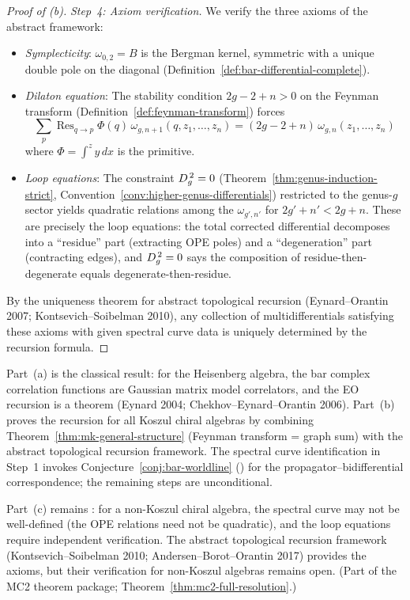 \begin{proof}[Proof of \textup{(b)}]
\emph{Step~4: Axiom verification.}
We verify the three axioms of the abstract framework:
\begin{itemize}
\item \emph{Symplecticity}: $\omega_{0,2} = B$ is the Bergman kernel,
symmetric with a unique double pole on the diagonal
(Definition~\ref{def:bar-differential-complete}).

\item \emph{Dilaton equation}: The stability condition
$2g - 2 + n > 0$ on the Feynman transform
(Definition~\ref{def:feynman-transform}) forces
\[
\textstyle\sum_{p} \operatorname{Res}_{q \to p} \Phi(q)\,
\omega_{g,n+1}(q, z_1, \ldots, z_n)
= (2g{-}2{+}n)\,\omega_{g,n}(z_1,\ldots,z_n)
\]
where $\Phi = \int^z y\,dx$ is the primitive.

\item \emph{Loop equations}: The constraint $D_{g}^{\,2} = 0$
(Theorem~\ref{thm:genus-induction-strict},
Convention~\ref{conv:higher-genus-differentials}) restricted to the
genus-$g$ sector yields quadratic relations among the
$\omega_{g',n'}$ for $2g'+n' < 2g+n$.  These are precisely
the loop equations: the total corrected differential decomposes
into a ``residue'' part (extracting OPE poles) and a
``degeneration'' part (contracting edges), and $D_{g}^{\,2} = 0$ says
the composition of residue-then-degenerate equals
degenerate-then-residue.
\end{itemize}

By the uniqueness theorem for abstract topological recursion
(Eynard--Orantin 2007; Kontsevich--Soibelman 2010), any collection
of multidifferentials satisfying these axioms with given spectral
curve data is uniquely determined by the recursion formula.
\end{proof}

\begin{remark}[Scope]
Part~(a) is the classical result: for the Heisenberg algebra, the
bar complex correlation functions are Gaussian matrix model correlators,
and the EO recursion is a theorem (Eynard 2004;
Chekhov--Eynard--Orantin 2006).  Part~(b) proves the recursion for
all Koszul chiral algebras by combining
Theorem~\ref{thm:mk-general-structure} (Feynman transform = graph sum)
with the abstract topological recursion framework.
The spectral curve identification in Step~1 invokes
Conjecture~\ref{conj:bar-worldline} (\ClaimStatusHeuristic) for the
propagator--bidifferential correspondence; the remaining
steps are unconditional.

Part~(c) remains \ClaimStatusConjectured{}: for a non-Koszul chiral
algebra, the spectral curve may not be well-defined (the OPE relations
need not be quadratic), and the loop equations require independent
verification.  The abstract topological recursion framework
(Kontsevich--Soibelman 2010; Andersen--Borot--Orantin 2017) provides
the axioms, but their verification for non-Koszul algebras remains open.
(Part of the MC2 theorem package; Theorem~\ref{thm:mc2-full-resolution}.)
\end{remark}

